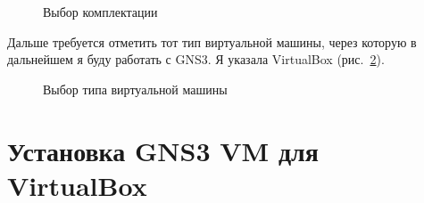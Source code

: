 \documentclass[
  english,
  russian,
  12pt,
  a4paper,
  DIV=11,
  numbers=noendperiod]{scrreprt}
\begin{document}
\begin{figure}


\caption{\label{fig-003}Выбор комплектации}

\end{figure}%

Дальше требуется отметить тот тип виртуальной машины, через которую в
дальнейшем я буду работать с GNS3. Я указала VirtualBox
(рис.~\ref{fig-004}).

\begin{figure}


\caption{\label{fig-004}Выбор типа виртуальной машины}

\end{figure}%

\section{Установка GNS3 VM для
VirtualBox}\label{ux443ux441ux442ux430ux43dux43eux432ux43aux430-gns3-vm-ux434ux43bux44f-virtualbox}
\end{document}
